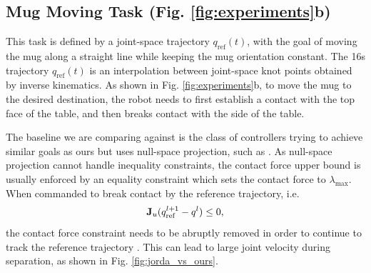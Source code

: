 \subsection{Mug Moving Task (Fig. \ref{fig:experiments}b) \label{sec:mug_holding_results}} 
This task is defined by a joint-space trajectory $q_{\text{ref}}(t)$, with the goal of moving the mug along a straight line while keeping the mug orientation constant. The 16s trajectory $q_{\text{ref}}(t)$ is an interpolation between joint-space knot points obtained by inverse kinematics. As shown in Fig. \ref{fig:experiments}b, to move the mug to the desired destination, the robot needs to first establish a contact with the top face of the table, and then breaks contact with the side of the table.

The baseline we are comparing against is the class of controllers trying to achieve similar goals as ours but uses null-space projection, such as \cite{jorda2019contact}. As null-space projection cannot handle inequality constraints, the contact force upper bound is usually enforced by an equality constraint which sets the contact force to $\lambda_\text{max}$. When commanded to break contact by the reference trajectory, i.e.
\begin{equation}
\label{eq:break_away}
    \mathbf{J}_u (q_\text{ref}^{l+1} - q^l) \leq 0,
\end{equation}
the contact force constraint needs to be abruptly removed in order to continue to track the reference trajectory \cite{jorda2019contact}. This can lead to large joint velocity during separation, as shown in Fig. \ref{fig:jorda_vs_ours}.

